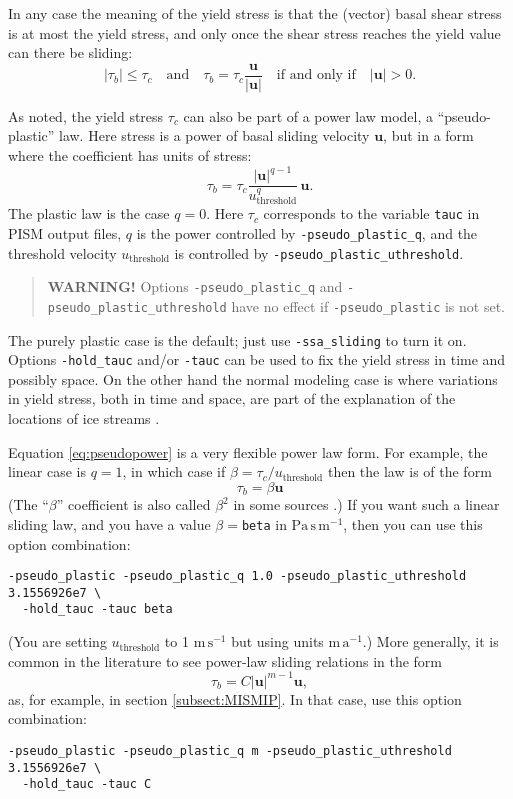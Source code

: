 In any case the meaning of the yield stress is that the (vector) basal shear stress is at most the yield stress, and only once the shear stress reaches the yield value can there be sliding:
\begin{equation*}
   |\tau_b| \le \tau_c \quad \text{and} \quad \tau_b = \tau_c \frac{\mathbf{u}}{|\mathbf{u}|} \quad\text{if and only if}\quad |\mathbf{u}| > 0.
\end{equation*}

As noted, the yield stress $\tau_c$ can also be part of a power law model, a ``pseudo-plastic'' law.  Here stress is a power of basal sliding velocity $\mathbf{u}$, but in a form where the coefficient has units of stress:
\begin{equation}
\tau_b = \tau_c \frac{|\mathbf{u}|^{q-1}}{u_{\text{threshold}}^q}\, \mathbf{u}.
\label{eq:pseudopower}
\end{equation}
The plastic law is the case $q=0$.  Here $\tau_c$ corresponds to the variable \texttt{tauc} in PISM output files, $q$ is the power controlled by \texttt{-pseudo_plastic_q}, and the threshold velocity $u_{\text{threshold}}$ is controlled by \texttt{-pseudo_plastic_uthreshold}.

\begin{quote}
  \textbf{WARNING!} Options \texttt{-pseudo_plastic_q} and \texttt{-pseudo_plastic_uthreshold} have no effect if \texttt{-pseudo_plastic} is not set.
\end{quote}

The purely plastic case is the default; just use \verb|-ssa_sliding| to turn it on.  Options \verb|-hold_tauc| and/or \verb|-tauc| can be used to fix the yield stress in time and possibly space.  On the other hand the normal modeling case is where variations in yield stress, both in time and space, are part of the explanation of the locations of ice streams \cite{SchoofStream}.

Equation \eqref{eq:pseudopower} is a very flexible power law form.  For example, the linear case is $q=1$, in which case if $\beta=\tau_c/u_{\text{threshold}}$ then the law is of the form
    $$\tau_b = \beta \mathbf{u}$$
(The ``$\beta$'' coefficient is also called $\beta^2$ in some sources \cite[for example]{MacAyeal}.)  If you want such a linear sliding law, and you have a value $\beta=$\verb|beta| in $\text{Pa}\,\text{s}\,\text{m}^{-1}$, then you can use this option combination:
\begin{verbatim}
-pseudo_plastic -pseudo_plastic_q 1.0 -pseudo_plastic_uthreshold 3.1556926e7 \
  -hold_tauc -tauc beta
\end{verbatim}
\noindent (You are setting $u_{\text{threshold}}$ to 1 $\text{m}\,\text{s}^{-1}$ but using units $\text{m}\,\text{a}^{-1}$.)  More generally, it is common in the literature to see power-law sliding relations in the form
    $$\tau_b = C |\mathbf{u}|^{m-1} \mathbf{u},$$
as, for example, in section \ref{subsect:MISMIP}.  In that case, use this option combination:
\begin{verbatim}
-pseudo_plastic -pseudo_plastic_q m -pseudo_plastic_uthreshold 3.1556926e7 \
  -hold_tauc -tauc C
\end{verbatim}

